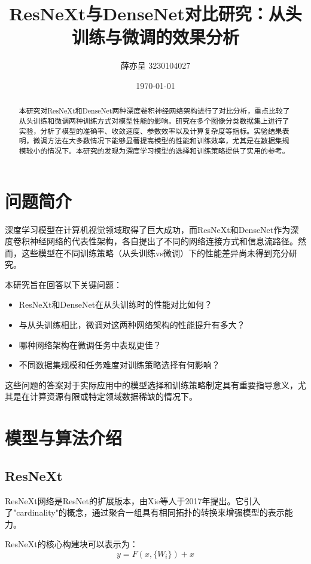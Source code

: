 \documentclass[a4paper,10pt,twocolumn]{article}
\title{ResNeXt与DenseNet对比研究：从头训练与微调的效果分析}
\author{薛亦呈 3230104027}
\date{\today}
\begin{document}
\maketitle

\begin{abstract}
本研究对ResNeXt和DenseNet两种深度卷积神经网络架构进行了对比分析，重点比较了从头训练和微调两种训练方式对模型性能的影响。研究在多个图像分类数据集上进行了实验，分析了模型的准确率、收敛速度、参数效率以及计算复杂度等指标。实验结果表明，微调方法在大多数情况下能够显著提高模型的性能和训练效率，尤其是在数据集规模较小的情况下。本研究的发现为深度学习模型的选择和训练策略提供了实用的参考。
\end{abstract}

\section{问题简介}
深度学习模型在计算机视觉领域取得了巨大成功，而ResNeXt和DenseNet作为深度卷积神经网络的代表性架构，各自提出了不同的网络连接方式和信息流路径。然而，这些模型在不同训练策略（从头训练vs微调）下的性能差异尚未得到充分研究。

本研究旨在回答以下关键问题：
\begin{itemize}
    \item ResNeXt和DenseNet在从头训练时的性能对比如何？
    \item 与从头训练相比，微调对这两种网络架构的性能提升有多大？
    \item 哪种网络架构在微调任务中表现更佳？
    \item 不同数据集规模和任务难度对训练策略选择有何影响？
\end{itemize}

这些问题的答案对于实际应用中的模型选择和训练策略制定具有重要指导意义，尤其是在计算资源有限或特定领域数据稀缺的情况下。

\section{模型与算法介绍}

\subsection{ResNeXt}
ResNeXt网络是ResNet的扩展版本，由Xie等人于2017年提出\cite{xie2017aggregated}。它引入了"cardinality"的概念，通过聚合一组具有相同拓扑的转换来增强模型的表示能力。

ResNeXt的核心构建块可以表示为：
\begin{equation}
y = F(x, \{W_i\}) + x
\end{equation}
\end{document}
